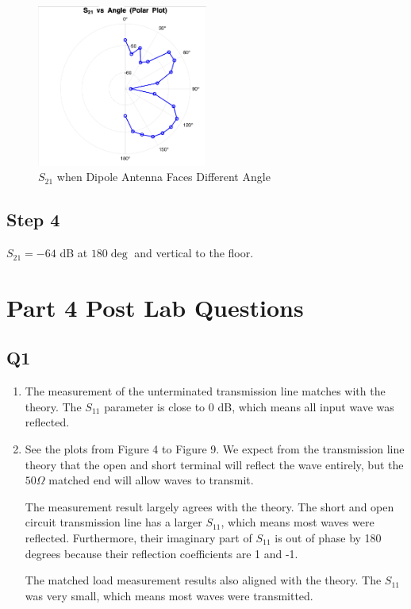 \documentclass{article} %
\begin{document}
\begin{figure}[H]
    \centering
    \includegraphics[width=0.5\textwidth]{./image/figure13.png}
    \caption{$S_{21}$ when Dipole Antenna Faces Different Angle}
\end{figure}

\subsection*{Step 4}
$S_{21} = -64$ dB at $180 \deg$ and vertical to the floor.

\section*{Part 4 Post Lab Questions}
\subsection*{Q1}

\begin{enumerate}[label=(\alph*)]
    \item The measurement of the unterminated transmission line matches with the theory. The $S_{11}$ parameter is close to 0 dB, which means all input wave was reflected.
    \item See the plots from Figure 4 to Figure 9. We expect from the transmission line theory that the open and short terminal will reflect the wave entirely, but the $50 \Omega$ matched end will allow waves to transmit.

          The measurement result largely agrees with the theory. The short and open circuit transmission line has a larger $S_{11}$, which means most waves were reflected. Furthermore, their imaginary part of $S_{11}$ is out of phase by 180 degrees because their reflection coefficients are 1 and -1.

          The matched load measurement results also aligned with the theory. The $S_{11}$ was very small, which means most waves were transmitted.
\end{enumerate}
\end{document}
